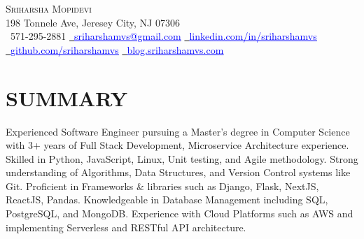 \documentclass[letterpaper,10pt]{article}
\begin{document}
\begin{center}
    {\Huge \scshape Sriharsha Mopidevi} \\ \vspace{1pt}
    198 Tonnele Ave, Jeresey City, NJ 07306\\ \vspace{1pt}
    \small \raisebox{-0.1\height}\faPhone\ 571-295-2881 \hspace{3pt} \href{mailto:sriharshamvs@gmail.com}{\raisebox{-0.2\height}\faEnvelope\  \textcolor{blue}{\underline{sriharshamvs@gmail.com}}} \hspace{3pt} \href{https://www.linkedin.com/in/sriharshamvs/}{\raisebox{-0.2\height}\faLinkedin\ \textcolor{blue}{\underline{linkedin.com/in/sriharshamvs}}} \hspace{3pt} \href{https://github.com/sriharshamvs}{\raisebox{-0.2\height}\faGithub\ \textcolor{blue}{\underline{github.com/sriharshamvs}}} \hspace{3pt} \href{https://blog.sriharshamvs.com/}{\raisebox{-0.2\height}\faBlogger\ \textcolor{blue}{\underline{blog.sriharshamvs.com}}}


\end{center}


\section{SUMMARY}
\begin{justify}\small
Experienced Software Engineer pursuing a Master's degree in Computer Science with 3+ years of Full Stack Development, Microservice Architecture experience. Skilled in Python, JavaScript, Linux, Unit testing, and Agile methodology. Strong understanding of Algorithms, Data Structures, and Version Control systems like Git. Proficient in Frameworks \& libraries such as Django, Flask, NextJS, ReactJS, Pandas. Knowledgeable in Database Management including SQL, PostgreSQL, and MongoDB. Experience with Cloud Platforms such as AWS and implementing Serverless and RESTful API architecture.
\end{justify}

\end{document}
